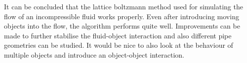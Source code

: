 It can be concluded that the lattice boltzmann method used for simulating the flow of an incompressible fluid works properly. Even after introducing moving objects into the flow, the algorithm performs quite well. Improvements can be made to further stabilise the fluid-object interaction and also different pipe geometries can be studied. It would be nice to also look at the behaviour of multiple objects and introduce an object-object interaction.
